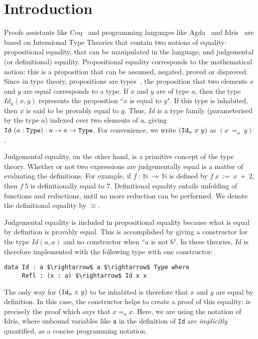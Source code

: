 \section{Introduction}

Proofs assistants like Coq~\cite{BertotC04} 
and programming languages like 
Agda~\cite{norell2007thesis} and
Idris~\cite{brady2013idris} are based on Intensional Type Theories that contain
two notions of equality: propositional equality, that can be
manipulated in the language, and judgemental (or definitional) equality.
Propositional equality corresponds to the mathematical notion: this is
a proposition that can be assumed, negated, proved or disproved. Since in type
theory, propositions are types~\cite{How80}, the proposition that two
elements $x$ and $y$ are equal corresponds to a type.
If $x$ and $y$ are of type $a$, then the type
$Id_a(x, y)$ represents the proposition ``$x$ is equal to $y$". If this type is
inhabited, then $x$ is said to be provably equal to $y$. Thus, $Id$ is a type family (parameterised by the type $a$) indexed over two elements of $a$, giving ${\mbox{\texttt{Id}}}\ (a:{\mbox{\texttt{Type}}}):a \rightarrow a \rightarrow {\mbox{\texttt{Type}}}$. For
convenience, we write $(\code{Id}_a\ x\ y)$ as $(x\ =_a\ y)$. 

Judgemental equality, on the other hand, is a primitive concept of
the type theory.
Whether or not two expressions are judgementally equal is a matter of
evaluating the definitions. For example, if $f\ :\ \mathbb{N}\ \rightarrow\
\mathbb{N}$ is defined by $f\ x\ :=\ x\ +\ 2$, then $f\ 5$ is
definitionally equal to $7$. Definitional equality entails unfolding
of functions and reductions, until no more reduction can be
performed. We denote the definitional equality by $\equiv$.

Judgemental equality is included in propositional equality
because what is equal by definition is provably equal. This is
accomplished by giving a constructor for the type $Id(a,a)$ and no
constructor when ``$a$ is not $b$".  In these theories, $Id$ is therefore
implemented with the following type with one constructor:

\begin{lstlisting}
data Id : a $\rightarrow$ a $\rightarrow$ Type where
     Refl : (x : a) $\rightarrow$ Id x x
\end{lstlisting}

The only way for $(\code{Id}_a\ x\ y)$ to be inhabited is therefore that $x$ and $y$ are equal by definition. In this case, the constructor  helps to create a proof of this equality:  is precisely the proof
which says that $x=_ax$. 
Here, we are using the notation of Idris, where unbound variables
like \texttt{a} in the definition of \texttt{Id} are
\emph{implicitly} quantified, as a concise programming notation. 


